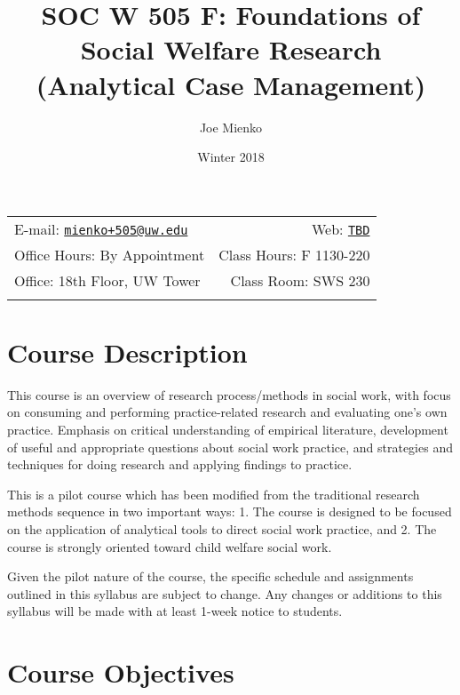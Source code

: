 \documentclass[11pt,]{article}
\title{SOC W 505 F: Foundations of Social Welfare Research (Analytical Case
Management)}
\author{Joe Mienko}
\date{Winter 2018}
\begin{document}
  

		\maketitle
		
	
		\thispagestyle{firststyle}



	\noindent \begin{tabular*}{\textwidth}{ @{\extracolsep{\fill}} lr @{\extracolsep{\fill}}}


E-mail: \texttt{\href{mailto:mienko+505@uw.edu}{\nolinkurl{mienko+505@uw.edu}}} & Web: \href{http://TBD}{\tt TBD}\\
Office Hours: By Appointment  &  Class Hours: F 1130-220\\
Office: 18th Floor, UW Tower  & Class Room: SWS 230\\
	&  \\
	\hline
	\end{tabular*}
	
\vspace{2mm}
	


\section{Course Description}\label{course-description}

This course is an overview of research process/methods in social work,
with focus on consuming and performing practice-related research and
evaluating one's own practice. Emphasis on critical understanding of
empirical literature, development of useful and appropriate questions
about social work practice, and strategies and techniques for doing
research and applying findings to practice.

This is a pilot course which has been modified from the traditional
research methods sequence in two important ways: 1. The course is
designed to be focused on the application of analytical tools to direct
social work practice, and 2. The course is strongly oriented toward
child welfare social work.

Given the pilot nature of the course, the specific schedule and
assignments outlined in this syllabus are subject to change. Any changes
or additions to this syllabus will be made with at least 1-week notice
to students.

\section{Course Objectives}\label{course-objectives}
\end{document}
